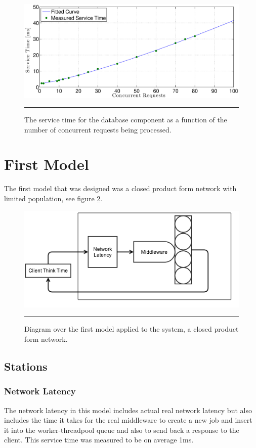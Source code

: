 \documentclass[a4paper, 11pt]{article}
\begin{document}
		\begin{figure}[ch!]
			\centering
				\includegraphics[width=\linewidth]{dbServiceTime}
				\rule{35em}{0.5pt}
			\caption{The service time for the database component as a function of the number of concurrent requests being processed.}
			\label{fig:db-service-time}
		\end{figure}
		\FloatBarrier

\section{First Model}\label{sec:first-model}
The first model that was designed was a closed product form network with limited population, see figure \ref{fig:firstmodel}.

\begin{figure}[ch!]
	\centering
		\includegraphics[width=0.8\linewidth]{firstmodel}
		\rule{35em}{0.5pt}
	\caption{Diagram over the first model applied to the system, a closed product form network.}
	\label{fig:firstmodel}
\end{figure}

\subsection{Stations}
\subsubsection{Network Latency}
The network latency in this model includes actual real network latency but also includes the time it takes for the real middleware to create a new job and insert it into the worker-threadpool queue and also to send back a response to the client. This service time was measured to be on average 1ms.
\end{document}
